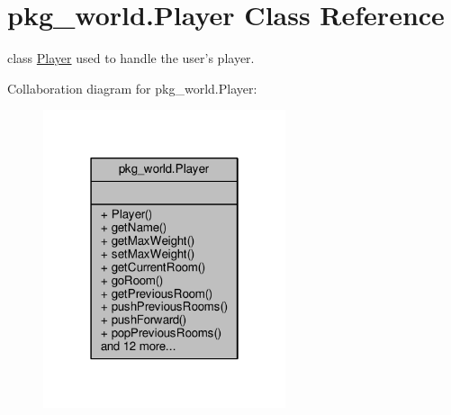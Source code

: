 \hypertarget{classpkg__world_1_1Player}{\section{pkg\-\_\-world.\-Player Class Reference}
\label{classpkg__world_1_1Player}
}


class \hyperlink{classpkg__world_1_1Player}{Player} used to handle the user's player.  




Collaboration diagram for pkg\-\_\-world.\-Player\-:
\nopagebreak
\begin{figure}[H]
\begin{center}
\leavevmode
\includegraphics[width=202pt]{classpkg__world_1_1Player__coll__graph}
\end{center}
\end{figure}
